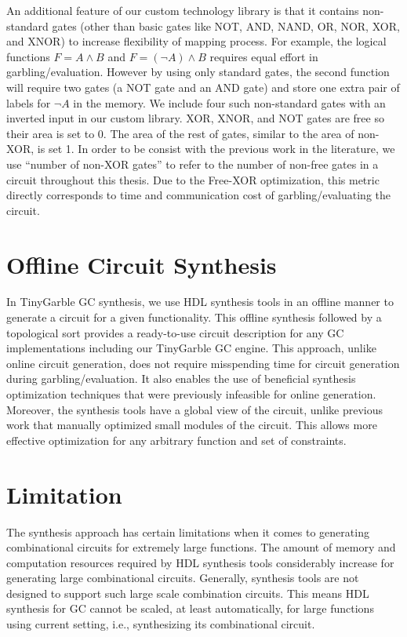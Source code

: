 An additional feature of our custom technology library is that it contains non-standard gates (other than basic gates like NOT, AND, NAND, OR, NOR, XOR, and XNOR) to increase flexibility of mapping process.
For example, the logical functions $F = A\wedge B$ and $F = (\neg A)\wedge B$ requires equal effort in garbling/evaluation.
However by using only standard gates, the second function will require two gates (a NOT gate and an AND gate) and store one extra pair of labels for $\neg A$ in the memory.
We include four such non-standard gates with an inverted input in our custom library.
XOR, XNOR, and NOT gates are free so their area is set to 0.
The area of the rest of gates, similar to the area of non-XOR, is set 1.
In order to be consist with the previous work in the literature, we use ``number of non-XOR gates'' to refer to the number of non-free gates in a circuit throughout this thesis.
Due to the Free-XOR optimization, this metric directly corresponds to time and communication cost of garbling/evaluating the circuit.

\section{Offline Circuit Synthesis}\label{sec:syn-offline}
In TinyGarble GC synthesis, we use HDL synthesis tools in an offline manner to generate a circuit for a given functionality.
This offline synthesis followed by a topological sort provides a ready-to-use circuit description for any GC implementations including our TinyGarble GC engine.
This approach, unlike online circuit generation, does not require misspending time for circuit generation during garbling/evaluation.
It also enables the use of beneficial synthesis optimization techniques that were previously infeasible for online generation.
Moreover, the synthesis tools have a global view of the circuit, unlike previous work that manually optimized small modules of the circuit.
This allows more effective optimization for any arbitrary function and set of constraints.

\section{Limitation}\label{sec:syn-limit}
The synthesis approach has certain limitations when it comes to generating combinational circuits for extremely large functions.
The amount of memory and computation resources required by HDL synthesis tools considerably increase for generating large combinational circuits.
Generally, synthesis tools are not designed to support such large scale combination circuits.
This means HDL synthesis for GC cannot be scaled, at least automatically, for large functions using current setting, i.e., synthesizing its combinational circuit.


